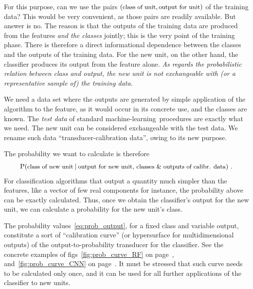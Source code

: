 \documentclass[a4paper,12pt,%
onecolumn,oneside,article,%
british%
]{memoir}
\newcommand*{\amp}{\&}
\renewcommand*{\P}{\mathrm{P}}%
\renewcommand*{\|}[1][]{\nonscript\:#1\vert\nonscript\:\mathopen{}}
\newcommand*{\figs}{figs}%
\newcommand*{\texts}[1]{\text{\small #1}}
\newcommand*{\ml}{machine-learning}
\begin{document}
For this purpose, can we use the pairs $(\texts{class of unit}, \texts{output for unit})$ of the training data? This would be very convenient, as those pairs are readily available. But answer is no. The reason is that the outputs of the training data are produced from the features \emph{and the classes} jointly; this is the very point of the training phase. There is therefore a direct informational dependence between the classes and the outputs of the training data. For the new unit, on the other hand, the classifier produces its output from the feature alone. \emph{As regards the probabilistic relation between class and output, the new unit is not exchangeable with (or a representative sample of) the training data}.

We need a data set where the outputs are generated by simple application of the algorithm to the feature, as it would occur in its concrete use, and the classes are known. The \emph{test data} of standard \ml\ procedures are exactly what we need. The new unit can be considered exchangeable with the test data. We rename such data \enquote{transducer-calibration data}, owing to its new purpose.

The probability we want to calculate is therefore
\begin{equation}
  \label{eq:prob_output}
  \P(\texts{class of new unit} \| \texts{output for new unit},\,
  \texts{classes \amp\ outputs of calibr. data}) \ .
\end{equation}
For classification algorithms that output a quantity much simpler than the features, like a vector of few real components for instance, the probability above can be exactly calculated. Thus, once we obtain the classifier's output for the new unit, we can calculate a probability for the new unit's class.


The probability values~\eqref{eq:prob_output}, for a fixed class and variable output, constitute a sort of \enquote{calibration curve} (or hypersurface for multidimensional outputs) of the output-to-probability transducer for the classifier. See the concrete examples of \figs~\ref{fig:prob_curve_RF} on page~\pageref{fig:prob_curve_RF}, and~\ref{fig:prob_curve_CNN} on page~\pageref{fig:prob_curve_CNN}. It must be stressed that such curve needs to be calculated only once, and it can be used for all further applications of the classifier to new units.

\medskip
\end{document}
